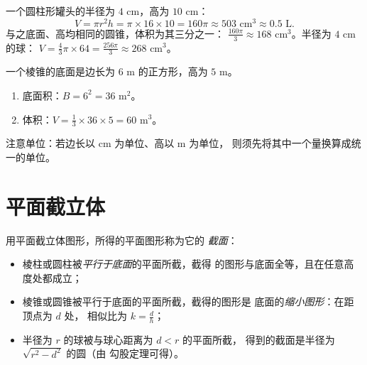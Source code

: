 \begin{example}\label{ex:g9:solids:volumes}
一个圆柱形罐头的半径为 $4$ cm，高为 $10$ cm：
\[
V = \pi r^2 h = \pi \times 16 \times 10 = 160\pi \approx 503 \text{ cm}^3
\approx 0.5 \text{ L}.
\]
与之底面、高均相同的圆锥，体积为其三分之一：
$\frac{160\pi}{3} \approx 168$ cm$^3$。半径为 $4$ cm 的球：
$V = \frac43 \pi \times 64 = \frac{256\pi}{3} \approx 268$ cm$^3$。
\end{example}

\begin{example}[逐步求棱锥的体积]\label{ex:g9:solids:pyramid}
一个棱锥的底面是边长为 $6$ m 的正方形，高为 $5$ m。
\begin{enumerate}
  \item 底面积：$B = 6^2 = 36$ m$^2$。
  \item 体积：$V = \frac13 \times 36 \times 5 = 60$ m$^3$。
\end{enumerate}
注意单位：若边长以 cm 为单位、高以 m 为单位，
则须先将其中一个量换算成统一的单位。
\end{example}

\section{平面截立体}

\begin{proposition}[经典立体图形的截面]\label{prop:g9:solids:sections}
用平面截立体图形，所得的平面图形称为它的
\emph{截面}：
\begin{itemize}
  \item 棱柱或圆柱被\emph{平行于底面}的平面所截，截得
        的图形与底面全等，且在任意高度处都成立；
  \item 棱锥或圆锥被平行于底面的平面所截，截得的图形是
        底面的\emph{缩小图形}：在距顶点为 $d$ 处，
        相似比为 $k = \frac{d}{h}$；
  \item 半径为 $r$ 的球被与球心距离为 $d < r$ 的平面所截，
        得到的截面是半径为 $\sqrt{r^2 - d^2}$ 的圆（由
        勾股定理可得）。
\end{itemize}
\end{proposition}
\admitted

